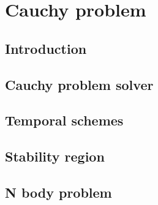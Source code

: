 
 \chapter{Cauchy problem}
 
 \section{Introduction}
 
 
 \section{Cauchy problem solver}
 
 
 \section{Temporal schemes} 
 
 
 \section{Stability region} 
 
 
 \section{N body problem} 
